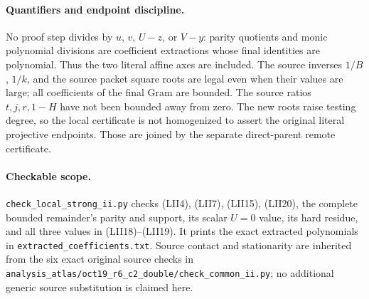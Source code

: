 \paragraph{Quantifiers and endpoint discipline.}
No proof step divides by $u$, $v$, $U-z$, or $V-y$: parity quotients
and monic polynomial divisions are coefficient extractions whose
final identities are polynomial.  Thus the two literal affine axes
are included.  The source inverses $1/B$, $1/k$, and the source
packet square roots are legal even when their values are large;
all coefficients of the final Gram are bounded.  The source ratios
$t,j,r,1-H$ have not been bounded away from zero.  The new roots
raise testing degree, so the local certificate is not homogenized
to assert the original literal projective endpoints.  Those are
joined by the separate direct-parent remote certificate.

\paragraph{Checkable scope.}
\texttt{check\_local\_strong\_ii.py} checks (LII4), (LII7),
(LII15), (LII20), the complete bounded remainder's parity and support,
its scalar $U=0$ value, its hard residue, and all three values in
(LII18)--(LII19).  It prints the exact extracted polynomials in
\texttt{extracted\_coefficients.txt}.  Source contact and stationarity
are inherited from the six exact original source checks in
\texttt{analysis\_atlas/oct19\_r6\_c2\_double/check\_common\_ii.py};
no additional generic source substitution is claimed here.
